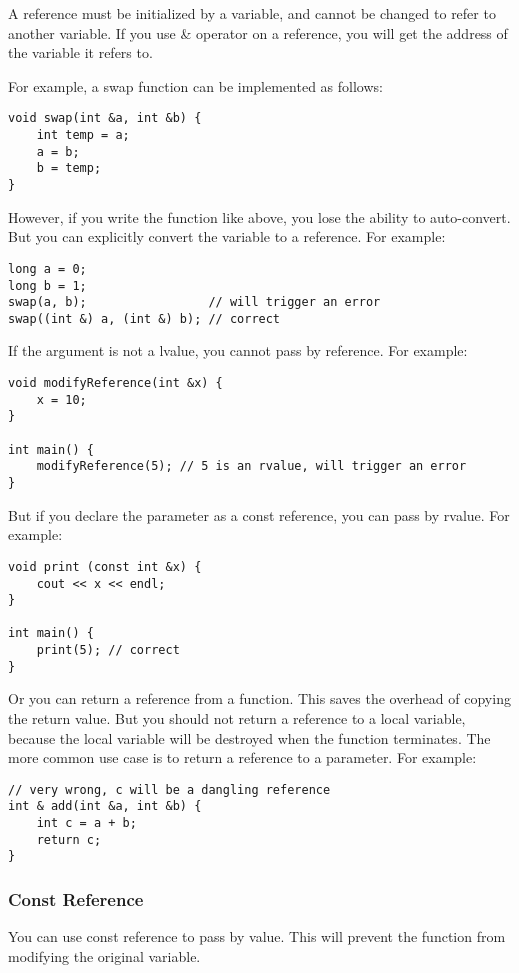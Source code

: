 \documentclass[a4paper,12pt]{article}
\begin{document}
A reference must be initialized by a variable, and cannot be changed to refer to another variable.
If you use \& operator on a reference, you will get the address of the variable it refers to.

For example, a swap function can be implemented as follows:
\begin{verbatim}
void swap(int &a, int &b) {
    int temp = a;
    a = b;
    b = temp;
}
\end{verbatim}

However, if you write the function like above, you lose the ability to auto-convert.
But you can explicitly convert the variable to a reference.
For example:
\begin{verbatim}
long a = 0;
long b = 1;
swap(a, b);                 // will trigger an error
swap((int &) a, (int &) b); // correct
\end{verbatim}

If the argument is not a lvalue, you cannot pass by reference.
For example:
\begin{verbatim}
void modifyReference(int &x) {
    x = 10;
}

int main() {
    modifyReference(5); // 5 is an rvalue, will trigger an error
}
\end{verbatim}

But if you declare the parameter as a const reference, you can pass by rvalue.
For example:
\begin{verbatim}
void print (const int &x) {
    cout << x << endl;
}

int main() {
    print(5); // correct
}
\end{verbatim}

Or you can return a reference from a function.
This saves the overhead of copying the return value.
But you should not return a reference to a local variable, because the local variable will be destroyed when the function terminates.
The more common use case is to return a reference to a parameter.
For example:
\begin{verbatim}
// very wrong, c will be a dangling reference
int & add(int &a, int &b) {
    int c = a + b;
    return c;
}
\end{verbatim}

\subsubsection{Const Reference}

You can use const reference to pass by value.
This will prevent the function from modifying the original variable.
\end{document}
